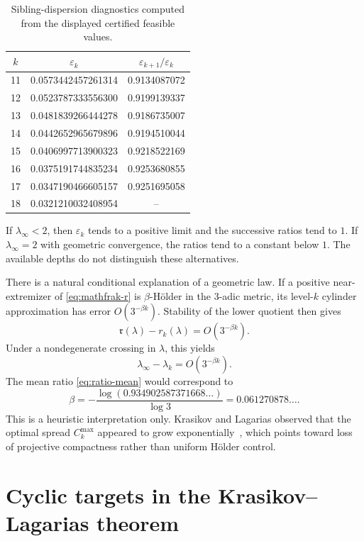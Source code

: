 \documentclass[11pt]{amsart}
\numberwithin{equation}{section}
\newcommand{\eps}{\varepsilon}
\begin{document}
\begin{table}[ht]
\centering
\caption{Sibling-dispersion diagnostics computed from the displayed certified feasible values.}
\label{tab:defects}
\begin{tabular}{c@{\qquad}c@{\qquad}c}
\toprule
$k$&$\eps_k$&$\eps_{k+1}/\eps_k$\\
\midrule
11&0.0573442457261314&0.9134087072\\
12&0.0523787333556300&0.9199139337\\
13&0.0481839266444278&0.9186735007\\
14&0.0442652965679896&0.9194510044\\
15&0.0406997713900323&0.9218522169\\
16&0.0375191744835234&0.9253680855\\
17&0.0347190466605157&0.9251695058\\
18&0.0321210032408954&--\\
\bottomrule
\end{tabular}
\end{table}

If $\lambda_\infty<2$, then $\eps_k$ tends to a positive limit and the successive ratios tend to $1$.  If $\lambda_\infty=2$ with geometric convergence, the ratios tend to a constant below $1$.  The available depths do not distinguish these alternatives.

There is a natural conditional explanation of a geometric law.  If a positive near-extremizer of \eqref{eq:mathfrak-r} is $\beta$-H\"older in the $3$-adic metric, its level-$k$ cylinder approximation has error $O(3^{-\beta k})$.  Stability of the lower quotient then gives
\begin{equation}\label{eq:holder-rate}
\mathfrak r(\lambda)-r_k(\lambda)=O(3^{-\beta k}).
\end{equation}
Under a nondegenerate crossing in $\lambda$, this yields
\[
\lambda_\infty-\lambda_k=O(3^{-\beta k}).
\]
The mean ratio \eqref{eq:ratio-mean} would correspond to
\begin{equation}\label{eq:beta-fit}
\beta
=-\frac{\log(0.934902587371668\ldots)}{\log3}
=0.061270878\ldots.
\end{equation}
This is a heuristic interpretation only.  Krasikov and Lagarias observed that the optimal spread $C_k^{\max}$ appeared to grow exponentially~\cite[Section~6]{KrasikovLagarias2003}, which points toward loss of projective compactness rather than uniform H\"older control.

\section{Cyclic targets in the Krasikov--Lagarias theorem}\label{sec:cyclic-target-fix}
\end{document}
